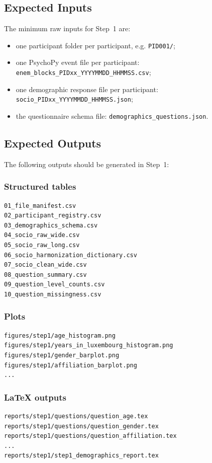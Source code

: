 \documentclass[11pt]{article}
\begin{document}
\subsection{Expected Inputs}
The minimum raw inputs for Step~1 are:
\begin{itemize}
    \item one participant folder per participant, e.g. \texttt{PID001/};
    \item one PsychoPy event file per participant:
    \texttt{enem\_blocks\_PIDxx\_YYYYMMDD\_HHMMSS.csv};
    \item one demographic response file per participant:
    \texttt{socio\_PIDxx\_YYYYMMDD\_HHMMSS.json};
    \item the questionnaire schema file:
    \texttt{demographics\_questions.json}.
\end{itemize}

\subsection{Expected Outputs}
The following outputs should be generated in Step~1:

\subsubsection*{Structured tables}
\begin{verbatim}
01_file_manifest.csv
02_participant_registry.csv
03_demographics_schema.csv
04_socio_raw_wide.csv
05_socio_raw_long.csv
06_socio_harmonization_dictionary.csv
07_socio_clean_wide.csv
08_question_summary.csv
09_question_level_counts.csv
10_question_missingness.csv
\end{verbatim}

\subsubsection*{Plots}
\begin{verbatim}
figures/step1/age_histogram.png
figures/step1/years_in_luxembourg_histogram.png
figures/step1/gender_barplot.png
figures/step1/affiliation_barplot.png
...
\end{verbatim}

\subsubsection*{\LaTeX{} outputs}
\begin{verbatim}
reports/step1/questions/question_age.tex
reports/step1/questions/question_gender.tex
reports/step1/questions/question_affiliation.tex
...
reports/step1/step1_demographics_report.tex
\end{verbatim}
\end{document}
